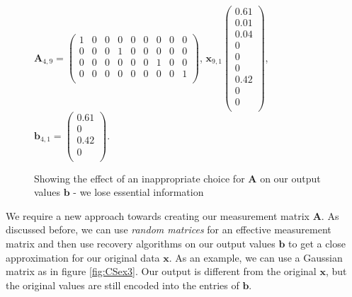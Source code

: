 \documentclass[titlepage,oneside, 12pt]{book}
\theoremstyle{break}
\begin{document}
\begin{figure}[H]
\centering
$
\textbf{A}_{4,9} = \begin{pmatrix}
1 & 0 & 0 & 0 & 0 & 0 & 0 & 0 & 0 \\
0 & 0 & 0 & 1 & 0 & 0 & 0 & 0 & 0 \\
0 & 0 & 0 & 0 & 0 & 0 & 1 & 0 & 0\\
0 & 0 & 0 & 0 & 0 & 0 & 0 & 0 & 1 \\
\end{pmatrix}  
$,
$
\textbf{x}_{9,1}\begin{pmatrix}
0.61\\
0.01\\
0.04\\
0\\
0\\
0\\
0.42\\
0\\
0\\
\end{pmatrix}  
$,
$
\textbf{b}_{4, 1} = \begin{pmatrix}
0.61\\
0\\
0.42\\
0\\
\end{pmatrix}  
$.

\caption{Showing the effect of an inappropriate choice for $\textbf{A}$ on our output values $\textbf{b}$ - we lose essential information}
\label{fig:CSex2}
\end{figure}

\newpage
We require a new approach towards creating our measurement matrix $\textbf{A}$. As discussed before, we can use \textit{random matrices} for an effective measurement matrix and then use recovery algorithms on our output values $\textbf{b}$ to get a close approximation for our original data $\textbf{x}$. As an example, we can use a Gaussian matrix as in figure \ref{fig:CSex3}. Our output is different from the original $\textbf{x}$, but the original values are still encoded into the entries of $\textbf{b}$. 
\end{document}
